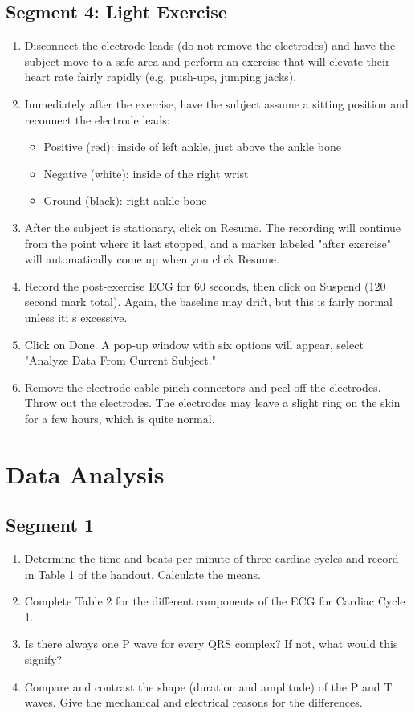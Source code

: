 \documentclass{article}
\begin{document}
\subsection*{Segment 4: Light Exercise}
\begin{enumerate}
	\item Disconnect the electrode leads (do not remove the electrodes) and have the subject move to a safe area and perform an exercise that will elevate their heart rate fairly rapidly (e.g. push-ups, jumping jacks).
	\item Immediately after the exercise, have the subject assume a sitting position and reconnect the electrode leads: \begin{itemize}
		\item Positive (red): inside of left ankle, just above the ankle bone
		\item Negative (white): inside of the right wrist
		\item Ground (black): right ankle bone
	\end{itemize}
	
	\item After the subject is stationary, click on Resume. The recording will continue from the point where it last stopped, and a marker labeled "after exercise" will automatically come up when you click Resume.
	\item Record the post-exercise ECG for 60 seconds, then click on Suspend (120 second mark total). Again, the baseline may drift, but this is fairly normal unless iti s excessive.
	\item Click on Done. A pop-up window with six options will appear, select "Analyze Data From Current Subject."
	\item Remove the electrode cable pinch connectors and peel off the electrodes. Throw out the electrodes. The electrodes may leave a slight ring on the skin for a few hours, which is quite normal.
\end{enumerate}

\section*{Data Analysis}
\subsection*{Segment 1}
\begin{enumerate}
	\item Determine the time and beats per minute of three cardiac cycles and record in Table 1 of the handout. Calculate the means.
	\item Complete Table 2 for the different components of the ECG for Cardiac Cycle 1.
	\item Is there always one P wave for every QRS complex? If not, what would this signify?
	\item Compare and contrast the shape (duration and amplitude) of the P and T waves. Give the mechanical and electrical reasons for the differences.
\end{enumerate}
\end{document}
